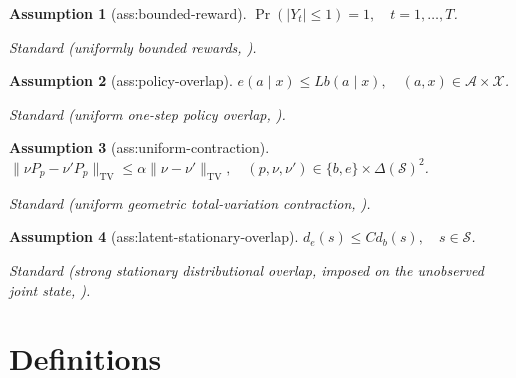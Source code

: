 \documentclass{article}
\newtheorem{assumption}{Assumption}
\begin{document}
\begin{assumption}[ass:bounded-reward]\label{ass:bounded-reward}
\(\Pr(|Y_t|\le1)=1,\quad t=1,\ldots,T\).
\par\smallskip\noindent\emph{Standard} (uniformly bounded rewards, \cite{HuWager2023}).
\end{assumption}

\begin{assumption}[ass:policy-overlap]\label{ass:policy-overlap}
\(e(a\mid x)\le Lb(a\mid x),\quad (a,x)\in\mathcal A\times\mathcal X\).
\par\smallskip\noindent\emph{Standard} (uniform one-step policy overlap, \cite{HuWager2023}).
\end{assumption}

\begin{assumption}[ass:uniform-contraction]\label{ass:uniform-contraction}
\(\|\nu P_p-\nu'P_p\|_{\mathrm{TV}}\le\alpha\|\nu-\nu'\|_{\mathrm{TV}},\quad (p,\nu,\nu')\in\{b,e\}\times\Delta(\mathcal S)^2\).
\par\smallskip\noindent\emph{Standard} (uniform geometric total-variation contraction, \cite{HuWager2023}).
\end{assumption}

\begin{assumption}[ass:latent-stationary-overlap]\label{ass:latent-stationary-overlap}
\(d_e(s)\le C d_b(s),\quad s\in\mathcal S\).
\par\smallskip\noindent\emph{Standard} (strong stationary distributional overlap, imposed on the unobserved joint state, \cite{MehrabiWager2025}).
\end{assumption}

\section{Definitions}
\end{document}
